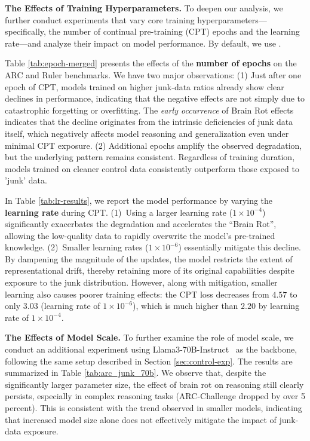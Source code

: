 \textbf{The Effects of Training Hyperparameters.} To deepen our analysis, we further conduct experiments that vary core training hyperparameters—specifically, the number of continual pre-training (CPT) epochs and the learning rate—and analyze their impact on model performance.
By default, we use \llama. 

Table \ref{tab:epoch-merged} presents the effects of the \textbf{number of epochs} on the ARC and Ruler benchmarks. We have two major observations: (1) Just after one epoch of CPT, models trained on higher junk-data ratios already show clear declines in performance, indicating that the negative effects are not simply due to catastrophic forgetting or overfitting. The \emph{early occurrence} of Brain Rot effects indicates that the decline originates from the intrinsic deficiencies of junk data itself, which negatively affects model reasoning and generalization even under minimal CPT exposure. (2) Additional epochs amplify the observed degradation, but the underlying pattern remains consistent. Regardless of training duration, models trained on cleaner control data consistently outperform those exposed to 'junk' data.





In Table \ref{tab:lr-results}, we report the model performance by varying the \textbf{learning rate} during CPT. 
(1)~Using a larger learning rate ($1\times10^{-4}$) significantly exacerbates the degradation and accelerates the ``Brain Rot'', allowing the low-quality data to rapidly overwrite the model's pre-trained knowledge.
(2)~Smaller learning rates ($1\times10^{-6}$) essentially mitigate this decline. By dampening the magnitude of the updates, the model restricts the extent of representational drift, thereby retaining more of its original capabilities despite exposure to the junk distribution.
However, along with mitigation, smaller learning also causes poorer training effects: the CPT loss decreases from $4.57$ to only $3.03$ (learning rate of $1\times10^{-6}$), which is much higher than $2.20$ by learning rate of $1\times10^{-4}$.



\textbf{The Effects of Model Scale.} To further examine the role of model scale, we conduct an additional experiment using Llama3-70B-Instruct~\citep{llama3} as the backbone, following the same setup described in Section \ref{sec:control-exp}. 
The results are summarized in Table \ref{tab:arc_junk_70b}.
We observe that, despite the significantly larger parameter size, the effect of brain rot on reasoning still clearly persists, especially in complex reasoning tasks (ARC-Challenge dropped by over 5 percent). This is consistent with the trend observed in smaller models, indicating that increased model size alone does not effectively mitigate the impact of junk-data exposure.

